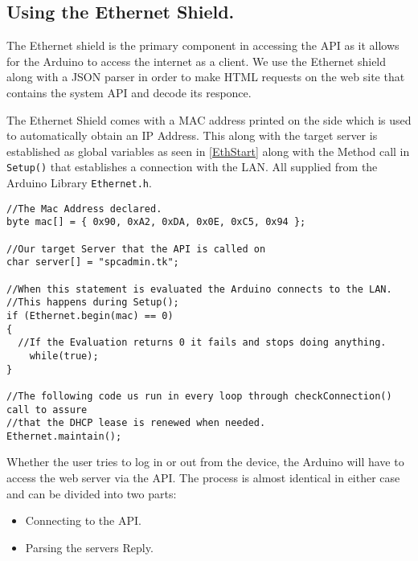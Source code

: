 \subsection{Using the Ethernet Shield.}
\label{sec:ethernetshield}
The Ethernet shield is the primary component in accessing the API as it allows for the Arduino to access the internet as a client.
We use the Ethernet shield along with a JSON parser in order to make HTML requests on the web site that contains the system API and decode its responce.

The Ethernet Shield comes with a MAC address printed on the side which is used to automatically obtain an IP Address.
This along with the target server is established as global variables as seen in \autoref{EthStart} along with the Method call in \verb|Setup()| that establishes a connection with the LAN. All supplied from the Arduino Library \verb|Ethernet.h|.

\begin{lstlisting}[frame=single, label=EthStart, caption=The Method Calls used to establish and maintain a connection.]
//The Mac Address declared.
byte mac[] = { 0x90, 0xA2, 0xDA, 0x0E, 0xC5, 0x94 };

//Our target Server that the API is called on
char server[] = "spcadmin.tk";

//When this statement is evaluated the Arduino connects to the LAN.
//This happens during Setup();
if (Ethernet.begin(mac) == 0) 
{
  //If the Evaluation returns 0 it fails and stops doing anything.
	while(true); 
}

//The following code us run in every loop through checkConnection() call to assure
//that the DHCP lease is renewed when needed.
Ethernet.maintain();
\end{lstlisting}

Whether the user tries to log in or out from the device, the Arduino will have to access the web server via the API.
The process is almost identical in either case and can be divided into two parts:
\begin{itemize}
	\item Connecting to the API.
	\item Parsing the servers Reply.
\end{itemize}

